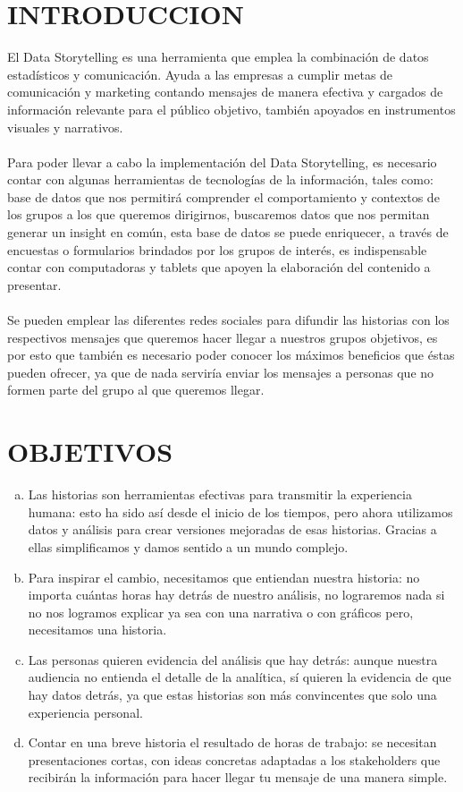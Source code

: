 \documentclass[preprint,12pt]{elsarticle}
\begin{document}
	\section{INTRODUCCION}
	\label{S:1}
	El Data Storytelling es una herramienta que emplea la combinación de datos estadísticos y comunicación. Ayuda a las empresas a cumplir metas de comunicación y marketing contando mensajes de manera efectiva y cargados de información relevante para el público objetivo, también apoyados en instrumentos visuales y narrativos.\\
	\\
	Para poder llevar a cabo la implementación del Data Storytelling, es necesario contar con algunas herramientas de tecnologías de la información, tales como: base de datos que nos permitirá comprender el comportamiento y contextos de los grupos a los que queremos dirigirnos, buscaremos datos que nos permitan generar un insight en común, esta base de datos se puede enriquecer, a través de encuestas o formularios brindados por los grupos de interés, es indispensable contar con computadoras y tablets que apoyen la elaboración del contenido a presentar.\\
	\\
	Se pueden emplear las diferentes redes sociales para difundir las historias con los respectivos mensajes que queremos hacer llegar a nuestros grupos objetivos, es por esto que también es necesario poder conocer los máximos beneficios que éstas pueden ofrecer, ya que de nada serviría enviar los mensajes a personas que no formen parte del grupo al que queremos llegar.
	
	\section{OBJETIVOS}
		\begin{enumerate}[a)]
			\item Las historias son herramientas efectivas para transmitir la experiencia humana: esto ha sido así desde el inicio de los tiempos, pero ahora utilizamos datos y análisis para crear versiones mejoradas de esas historias. Gracias a ellas simplificamos y damos sentido a un mundo complejo.
			\\
			\item Para inspirar el cambio, necesitamos que entiendan nuestra historia: no importa cuántas horas hay detrás de nuestro análisis, no lograremos nada si no nos logramos explicar ya sea con una narrativa o con gráficos pero, necesitamos una historia.
			\\
			\item Las personas quieren evidencia del análisis que hay detrás: aunque nuestra audiencia no entienda el detalle de la analítica, sí quieren la evidencia de que hay datos detrás, ya que estas historias son más convincentes que solo una experiencia personal.
			\\
			\item Contar en una breve historia el resultado de horas de trabajo: se necesitan presentaciones cortas, con ideas concretas adaptadas a los stakeholders que recibirán la información para hacer llegar tu mensaje de una manera simple. 
		\end{enumerate}
	
\end{document}
